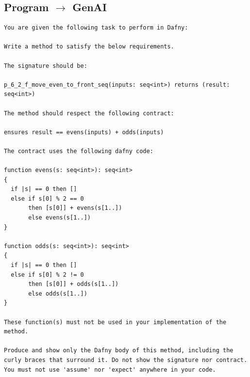 \documentclass{article}
\begin{document}
\subsection*{Program $\rightarrow$ GenAI}
\begin{lstlisting}
You are given the following task to perform in Dafny:

Write a method to satisfy the below requirements.

The signature should be:

p_6_2_f_move_even_to_front_seq(inputs: seq<int>) returns (result: seq<int>)

The method should respect the following contract:

ensures result == evens(inputs) + odds(inputs)

The contract uses the following dafny code:

function evens(s: seq<int>): seq<int>
{
  if |s| == 0 then []
  else if s[0] % 2 == 0
       then [s[0]] + evens(s[1..])
       else evens(s[1..])
}

function odds(s: seq<int>): seq<int>
{
  if |s| == 0 then []
  else if s[0] % 2 != 0
       then [s[0]] + odds(s[1..])
       else odds(s[1..])
}

These function(s) must not be used in your implementation of the method.

Produce and show only the Dafny body of this method, including the curly braces that surround it. Do not show the signature nor contract. You must not use 'assume' nor 'expect' anywhere in your code.
\end{lstlisting}
\end{document}
